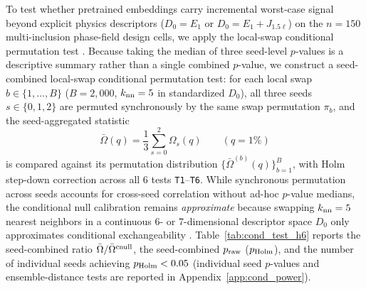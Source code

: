 \documentclass[preprint,11pt,a4paper]{elsarticle}
\begin{document}
To test whether pretrained embeddings carry incremental worst-case signal beyond explicit physics descriptors ($D_0=E_1$ or $D_0=E_1+J_{1.5\ell}$) on the $n=150$ multi-inclusion phase-field design cells, we apply the local-swap conditional permutation test \cite{Berrett2020,Kim2022}. Because taking the median of three seed-level $p$-values is a descriptive summary rather than a single combined $p$-value, we construct a seed-combined local-swap conditional permutation test: for each local swap $b\in\{1,\dots,B\}$ ($B=2{,}000$, $k_{\rm nn}=5$ in standardized $D_0$), all three seeds $s\in\{0,1,2\}$ are permuted synchronously by the same swap permutation $\pi_b$, and the seed-aggregated statistic
\begin{equation}
\bar\Omega(q) = \frac13\sum_{s=0}^2\Omega_s(q)
\qquad (q=1\%)
\label{eq:seed_combined_stat}
\end{equation}
is compared against its permutation distribution $\{\bar\Omega^{(b)}(q)\}_{b=1}^B$, with Holm step-down correction \cite{Holm1979} across all 6 tests \texttt{T1}--\texttt{T6}. While synchronous permutation across seeds accounts for cross-seed correlation without ad-hoc $p$-value medians, the conditional null calibration remains \emph{approximate} because swapping $k_{\rm nn}=5$ nearest neighbors in a continuous 6- or 7-dimensional descriptor space $D_0$ only approximates conditional exchangeability \cite{Kim2022}. Table~\ref{tab:cond_test_h6} reports the seed-combined ratio $\bar\Omega/\bar\Omega^{\rm cnull}$, the seed-combined $p_{\rm raw}$ ($p_{\rm Holm}$), and the number of individual seeds achieving $p_{\rm Holm}<0.05$ (individual seed $p$-values and ensemble-distance tests are reported in Appendix~\ref{app:cond_power}).
\end{document}
